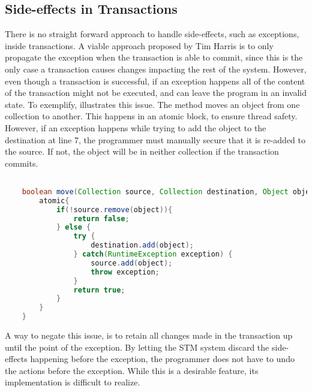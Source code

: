 \subsection{Side-effects in Transactions}
\label{subsec:stm:side_effects}
There is no straight forward approach to handle side-effects, such as exceptions, inside transactions. A viable approach proposed by Tim Harris\cite{harris2003language} is to only propagate the exception when the transaction is able to commit, since this is the only case a transaction causes changes impacting the rest of the system. However, even though a transaction is successful, if an exception happens all of the content of the transaction might not be executed, and can leave the program in an invalid state. To exemplify,  illustrates this issue. The method  moves an object from one collection to another. This happens in an atomic block, to ensure thread safety. However, if an exception happens while trying to add the object to the destination at line 7, the programmer must manually secure that it is re-added to the source. If not, the object will be in neither collection if the transaction commits. 
\begin{lstlisting}[label=lst:stm_exception,
  caption={[Exceptions in Transactions]Exceptions in Transactions \cite[p. 3]{harris2003language}},
  language=Java,  
  showspaces=false,
  showtabs=false,
  breaklines=true,
  showstringspaces=false,
  breakatwhitespace=true,
  commentstyle=\color{greencomments},
  keywordstyle=\color{bluekeywords},
  stringstyle=\color{redstrings},
  morekeywords={atomic, retry, orElse}]  % Start your code-block

	boolean move(Collection source, Collection destination, Object object){
		atomic{
			if(!source.remove(object)){
				return false;
			} else {
				try { 
					destination.add(object);
				} catch(RuntimeException exception) {
					source.add(object);
					throw exception;
				}
				return true;
			}
		}
	}      
\end{lstlisting}

A way to negate this issue, is to retain all changes made in the transaction up until the point of the exception. By letting the \ac{STM} system discard the side-effects happening before the exception, the programmer does not have to undo the actions before the exception. While this is a desirable feature, its implementation is difficult to realize\cite[p. 3]{harris2005exceptions}.

